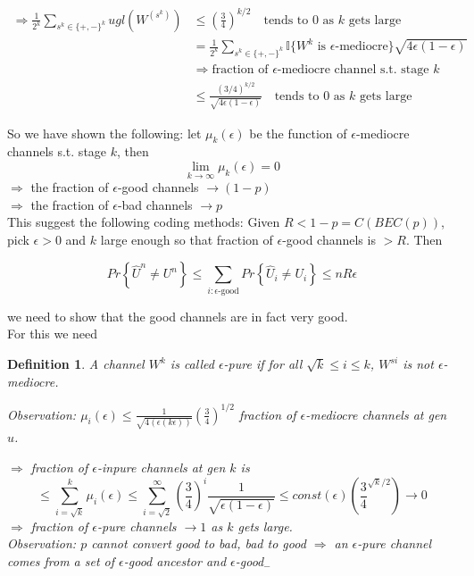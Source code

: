 \documentclass[twoside]{article}
\newtheorem{definition}{Definition}[section]
\theoremstyle{definition} %
\renewcommand{\Pr}[1]{Pr\left\{#1\right\}}
\def\I{\mathbb{I}}
\begin{document}
\begin{align*}
  \Rightarrow \frac{1}{2^k} \sum_{s^k \in \{+, -\}^k} ugl(W^{(s^k)}) &\leq (\frac{3}{4})^{k/2} \quad \text{tends to 0 as } k \text{ gets large} \\
  &= \frac{1}{2^k} \sum_{s^k \in \{+, -\}^k} \I\{W^k \text{ is } \epsilon \text{-mediocre}\} \sqrt{4 \epsilon(1 - \epsilon)} \\
  & \Rightarrow \text{fraction of } \epsilon \text{-mediocre channel s.t. stage } k \\
  & \leq \frac{(3/4)^{k/2}}{\sqrt{4 \epsilon (1 - \epsilon)}}  \quad \text{tends to 0 as } k \text{ gets large}
\end{align*}

So we have shown the following: let $\mu_k(\epsilon)$ be the function of $\epsilon$-mediocre channels s.t. stage $k$, then
\[
  \lim_{k \to \infty} \mu_k(\epsilon) = 0
\]
$\Rightarrow$ the fraction of $\epsilon$-good channels $\rightarrow (1-p)$\\
$\Rightarrow$ the fraction of $\epsilon$-bad channels $\rightarrow p$ \\

This suggest the following coding methods: Given $R < 1 - p = C(BEC(p))$, pick $\epsilon > 0$ and $k$ large enough so that fraction of $\epsilon$-good channels is $>R$. Then


\[
  \Pr{\hat{U}^n \neq U^n} \leq \sum_{i: \epsilon\text{-good}} \Pr{\hat{U}_i \neq U_i} \leq nR \epsilon
\]

we need to show that the good channels are in fact very good.\\

For this we need

\begin{definition}
  A channel $W^k$ is called $\epsilon$-pure if for all $\sqrt{k} \leq i \leq k$, $W^{si}$ is not $\epsilon$-mediocre.

  \textit{Observation:} $\mu_i(\epsilon) \leq \frac{1}{\sqrt{4(\epsilon(k \epsilon))}}(\frac{3}{4})^{1/2}$ fraction of $\epsilon$-mediocre channels at gen $u$.

  $\Rightarrow$ fraction of $\epsilon$-inpure channels at gen $k$ is
  \[
    \leq \sum_{i = \sqrt{k}}^k \mu_i(\epsilon) \leq \sum_{i = \sqrt{2}}^{\infty} (\frac{3}{4})^i \frac{1}{\sqrt{\epsilon(1 - \epsilon)}} \leq const (\epsilon)(\frac{3}{4}^{\sqrt{k}/2}) \rightarrow 0
  \]
  $\Rightarrow$ fraction of $\epsilon$-pure channels $\rightarrow 1$ as $k$ gets large.\\

  \textit{Observation:} $p$ cannot convert good to bad, bad to good $\Rightarrow$ an $\epsilon$-pure channel comes from a set of $\epsilon$-good ancestor and $\epsilon$-good$_-$
\end{definition}
\end{document}
